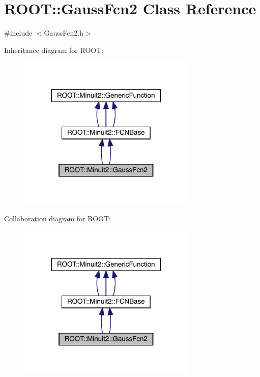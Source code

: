 \hypertarget{classROOT_1_1Minuit2_1_1GaussFcn2}{}\section{R\+O\+OT\+:\+:Gauss\+Fcn2 Class Reference}
\label{classROOT_1_1Minuit2_1_1GaussFcn2}


{\ttfamily \#include $<$Gauss\+Fcn2.\+h$>$}



Inheritance diagram for R\+O\+OT\+:
\nopagebreak
\begin{figure}[H]
\begin{center}
\leavevmode
\includegraphics[width=240pt]{de/dec/classROOT_1_1Minuit2_1_1GaussFcn2__inherit__graph}
\end{center}
\end{figure}


Collaboration diagram for R\+O\+OT\+:
\nopagebreak
\begin{figure}[H]
\begin{center}
\leavevmode
\includegraphics[width=240pt]{d9/d32/classROOT_1_1Minuit2_1_1GaussFcn2__coll__graph}
\end{center}
\end{figure}
